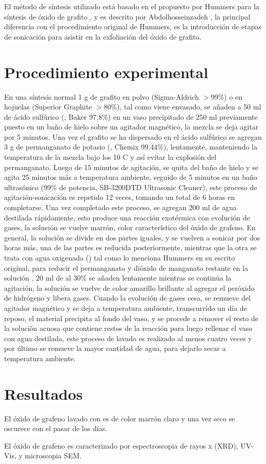 El método de síntesis utilizado está basado en el propuesto por Hummers para la síntesis de óxido de grafito \citep{Hummers1958}, y es descrito por Abdolhosseinzadeh \citep{Abdolhosseinzadeh2015}, la principal diferencia con el procedimiento original de Hummers, es la introducción de etapas de sonicación para asistir en la exfoliación del óxido de grafito.

\section{Procedimiento experimental}
En una síntesis normal 1 g de grafito en polvo (Sigma-Aldrich $>$99\%) o en hojuelas (Superior Graphite $>$80\%), tal como viene envasado, se añaden a 50 ml de ácido sulfúrico (, Baker 97.8\%) en un vaso precipitado de 250 ml previamente puesto en un baño de hielo sobre un agitador magnético, la mezcla se deja agitar por 5 minutos. Una vez el grafito se ha dispersado en el ácido sulfúrico se agregan 3 g de permanganato de potasio (, Chemix 99.44\%), lentamente, manteniendo la temperatura de la mezcla bajo los 10 C y así evitar la explosión del permanganato. Luego de 15 minutos de agitación, se quita del baño de hielo y se agita 25 minutos más a temperatura ambiente, seguido de 5 minutos en un baño ultrasónico (99\% de potencia, SB-3200DTD Ultrasonic Cleaner), este proceso de agitación-sonicación es repetido 12 veces, tomando un total de 6 horas en completarse. Una vez completado este proceso, se agregan 200 ml de agua destilada rápidamente, esto produce una reacción exotérmica con evolución de gases, la solución se vuelve marrón, color característico del óxido de grafeno. En general, la solución se divide en dos partes iguales, y se vuelven a sonicar por dos horas más, una de las partes es reducida posteriormente, mientras que la otra se trata con agua oxigenada () tal como lo menciona Hummers en su escrito original, para reducir el permanganato y dióxido de manganato restante en la solución \citep{Hummers1958}, 20 ml de  al 30\% se añaden lentamente mientras se continúa la  agitación, la solución se vuelve de color amarillo brillante al agregar el peróxido de hidrógeno y libera gases. Cuando la evolución de gases cesa, se remueve del agitador magnético y se deja a temperatura ambiente, transcurrido un día de reposo, el material precipita al fondo del vaso, y se procede a remover el resto de la solución acuosa que contiene restos de la reacción para luego rellenar el vaso con agua destilada, este proceso de lavado es realizado al menos cuatro veces y por último se remueve la mayor cantidad de agua, para dejarlo secar a temperatura ambiente.

\section{Resultados}

El óxido de grafeno lavado con  es de color marrón claro y una vez seco se oscurece con el pasar de los días.


El óxido de grafeno es caracterizado por espectroscopia de rayos x (XRD), UV-Vis, y microscopia SEM.

